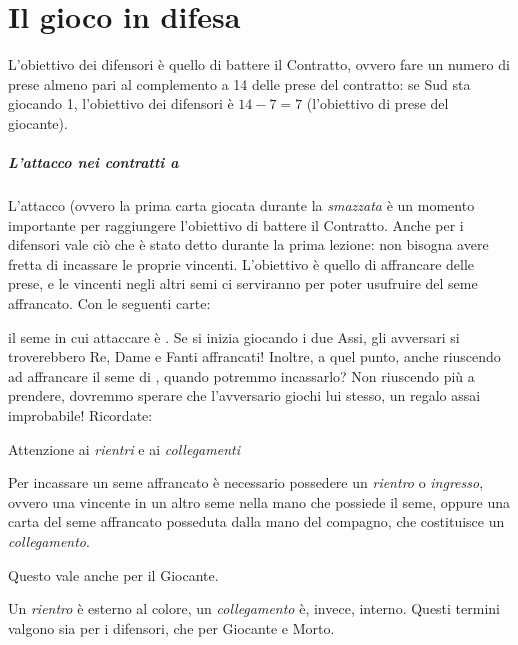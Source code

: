 \documentclass[../corsofiori.tex]{subfiles}
\begin{document}
\setcounter{chapter}{1}
\setcounter{regolactr}{2}
\chapter{Il gioco in difesa}

L'obiettivo dei difensori è quello di battere il Contratto, ovvero fare un numero di prese almeno pari al complemento a
14 delle prese del contratto: se Sud sta giocando 1\SA, l'obiettivo dei difensori è $14 - 7 = 7$ (l'obiettivo di prese del
giocante).

\paragraph{L'attacco nei contratti a \SA}

L'attacco (ovvero la prima carta giocata durante la \emph{smazzata} è un momento importante per raggiungere l'obiettivo di battere il
Contratto.
Anche per i difensori vale ciò che è stato detto durante la prima lezione: non bisogna avere fretta di incassare le
proprie vincenti. L'obiettivo è quello di affrancare delle prese, e le vincenti negli altri semi ci serviranno per poter
usufruire del seme affrancato.
Con le seguenti carte:
\begin{center}
\end{center}
il seme in cui attaccare è \fio. Se si inizia giocando i due Assi, gli avversari si troverebbero Re, Dame e Fanti
affrancati! Inoltre, a quel punto, anche riuscendo ad affrancare il seme di \fio, quando potremmo incassarlo? Non
riuscendo più a prendere, dovremmo sperare che l'avversario giochi \fio lui stesso, un regalo assai improbabile!
Ricordate:

\begin{attenzione}{Attenzione ai \emph{rientri} e ai \emph{collegamenti}}

    Per incassare un seme affrancato è necessario possedere un \emph{rientro} o \emph{ingresso}, ovvero una vincente in un altro seme
    nella mano che possiede il seme, oppure una carta del seme affrancato posseduta dalla mano del compagno, che
    costituisce un \emph{collegamento}.

\end{attenzione}


Questo vale anche per il Giocante.

Un \emph{rientro} è esterno al colore, un \emph{collegamento} è, invece, interno.
    Questi termini valgono sia per i difensori, che per Giocante e Morto.
\end{document}
